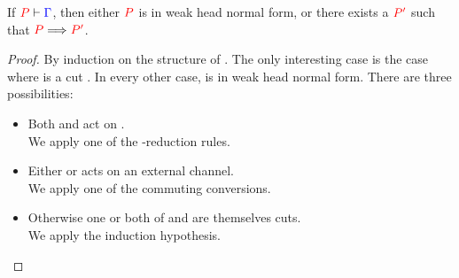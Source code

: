 \begin{theorem}\label{thm:cp-progress-1}
  If $\seq[{ P }]{ \Gamma }$, then either $\tm{P}$ is in weak head normal form,
  or there exists a $\tm{P'}$ such that $\reducesto{P}{P'}$.
\end{theorem}
\begin{proof}
  By induction on the structure of . The only interesting case is the
  case where  is a cut . In every other case,
   is in weak head normal form. There are three possibilities:
  \begin{itemize}
  \item
    Both  and  act on .
    \\
    We apply one of the \textbeta-reduction rules.
  \item
    Either  or  acts on an external channel.
    \\
    We apply one of the commuting conversions.
  \item
    Otherwise one or both of  and  are themselves cuts.
    \\
    We apply the induction hypothesis.
  \end{itemize}
\end{proof}
  